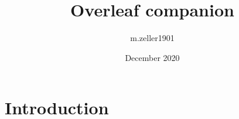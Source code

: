 \documentclass{article}
\title{Overleaf companion}
\author{m.zeller1901 }
\date{December 2020}
\begin{document}
\maketitle

\section{Introduction}
\end{document}
